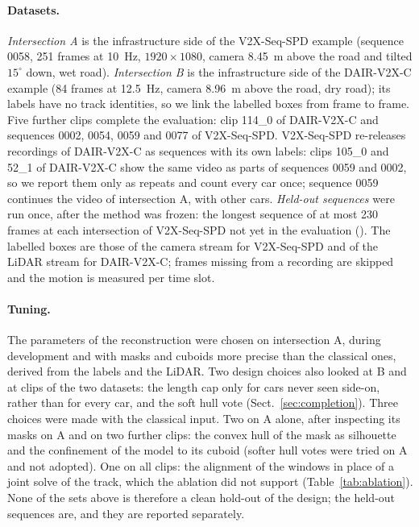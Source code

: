 \documentclass[runningheads,a4paper]{llncs}
\begin{document}
\paragraph{Datasets.} \emph{Intersection A} is the infrastructure side of the V2X-Seq-SPD example \cite{v2xseq}
(sequence 0058, 251 frames at 10~Hz, $1920 \times 1080$, camera 8.45~m above the road and tilted $15^\circ$ down,
wet road). \emph{Intersection B} is the infrastructure side of the DAIR-V2X-C example \cite{dairv2x} (84 frames at
12.5~Hz, camera 8.96~m above the road, dry road); its labels have no track identities, so we link the labelled boxes from frame to frame. Five further clips complete the evaluation: clip 114\_0 of DAIR-V2X-C and sequences 0002, 0054, 0059 and 0077 of V2X-Seq-SPD. V2X-Seq-SPD re-releases recordings of DAIR-V2X-C as sequences with its own labels: clips 105\_0 and 52\_1 of DAIR-V2X-C show the same video as parts of sequences 0059 and 0002, so we report them only as repeats and count every car once; sequence 0059 continues the video of intersection A, with other cars. \emph{Held-out sequences} were run once, after the method was frozen: the longest sequence of at most 230 frames at each intersection of V2X-Seq-SPD not yet in the evaluation (\ClsHNames{}). The labelled boxes are those of the camera stream for V2X-Seq-SPD and of the LiDAR stream for DAIR-V2X-C; frames missing from a recording are skipped and the motion is measured per time slot.

\paragraph{Tuning.} The parameters of the reconstruction were chosen on intersection A, during development and with
masks and cuboids more precise than the classical ones, derived from the labels and the LiDAR. Two design choices also looked at B and at clips of the two datasets: the length cap only for cars never seen
side-on, rather than for every car, and the soft hull vote (Sect.~\ref{sec:completion}). Three choices were made
with the classical input. Two on A alone, after inspecting its masks on A and on two further clips: the convex hull
of the mask as silhouette and the confinement of the model to its cuboid (softer hull votes were tried on A and not
adopted). One on all clips: the alignment of the windows in place of a joint solve of the track, which the ablation
did not support (Table~\ref{tab:ablation}). None of the sets above is therefore a clean hold-out of the design; the held-out sequences are, and they are reported separately.
\end{document}
